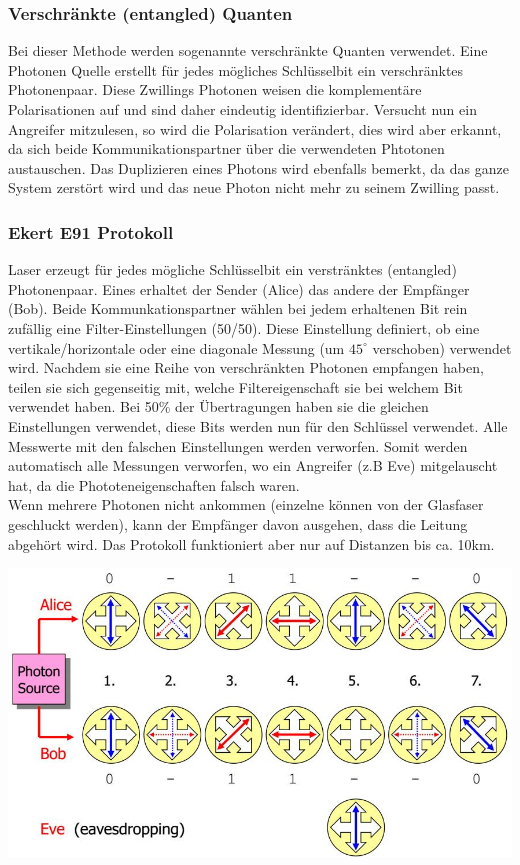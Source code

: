 \subsubsection{Verschränkte (entangled) Quanten}
Bei dieser Methode werden sogenannte verschränkte Quanten verwendet. Eine Photonen Quelle erstellt für jedes mögliches Schlüsselbit ein verschränktes Photonenpaar. Diese Zwillings Photonen weisen die komplementäre Polarisationen auf und sind daher eindeutig identifizierbar. Versucht nun ein Angreifer mitzulesen, so wird die Polarisation verändert, dies wird aber erkannt, da sich beide Kommunikationspartner über die verwendeten Phtotonen austauschen. Das Duplizieren eines Photons wird  ebenfalls bemerkt, da das ganze System zerstört wird und das neue Photon nicht mehr zu seinem Zwilling passt.



\subsubsection{Ekert E91 Protokoll}
Laser erzeugt für jedes mögliche Schlüsselbit ein verstränktes (entangled) Photonenpaar. Eines erhaltet der Sender (Alice) das andere der Empfänger (Bob). Beide Kommunkationspartner wählen bei jedem erhaltenen Bit rein zufällig eine Filter-Einstellungen (50/50). Diese Einstellung definiert, ob eine vertikale/horizontale oder eine diagonale Messung (um $45^{\circ}$ verschoben) verwendet wird. Nachdem sie eine Reihe von verschränkten Photonen empfangen haben, teilen sie sich gegenseitig mit, welche Filtereigenschaft sie bei welchem Bit verwendet haben. Bei 50\% der Übertragungen haben sie  die gleichen Einstellungen verwendet, diese Bits werden nun für den Schlüssel verwendet. Alle Messwerte mit den falschen Einstellungen werden verworfen. Somit werden automatisch alle Messungen verworfen, wo ein Angreifer (z.B Eve) mitgelauscht hat, da die Phototeneigenschaften falsch waren.\\
Wenn mehrere Photonen nicht ankommen (einzelne können von der Glasfaser geschluckt werden), kann der Empfänger davon ausgehen, dass die Leitung abgehört wird. Das Protokoll funktioniert aber nur auf Distanzen bis ca. 10km.

\begin{minipage}[t]{1\textwidth}
    \centering
	\includegraphics[width=0.9\linewidth]{images/entangled_photons}
    \caption{}
\label{fig:entangledphotons}
\end{minipage}


